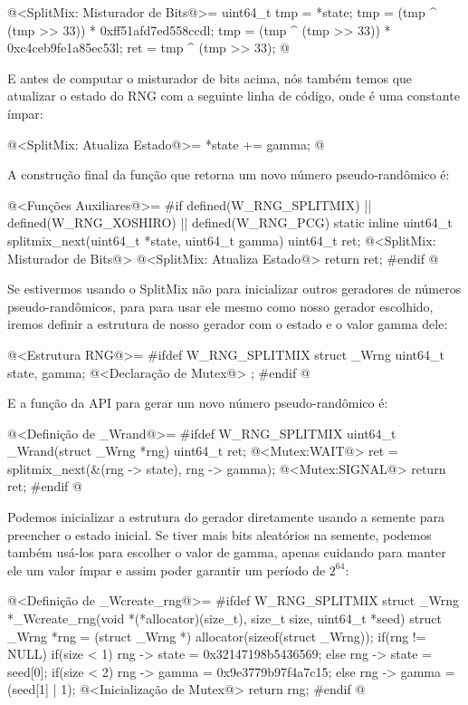 \iniciocodigo
@<SplitMix: Misturador de Bits@>=
{
  uint64_t tmp = *state;
  tmp = (tmp ^ (tmp >> 33)) * 0xff51afd7ed558ccdl;
  tmp = (tmp ^ (tmp >> 33)) * 0xc4ceb9fe1a85ec53l;
  ret = tmp ^ (tmp >> 33);
} 
@
\fimcodigo

E antes de computar o misturador de bits acima, nós também temos que
atualizar o estado do RNG com a seguinte linha de código,
onde  é uma constante ímpar:

\iniciocodigo
@<SplitMix: Atualiza Estado@>=
{
  *state +=  gamma;
} 
@
\fimcodigo

A construção final da função que retorna um novo número
pseudo-randômico é:

\iniciocodigo
@<Funções Auxiliares@>=
#if defined(W_RNG_SPLITMIX) || defined(W_RNG_XOSHIRO) || defined(W_RNG_PCG)
static inline uint64_t splitmix_next(uint64_t *state, uint64_t gamma){
  uint64_t ret;
  @<SplitMix: Misturador de Bits@>
  @<SplitMix: Atualiza Estado@>
  return ret;
}
#endif
@
\fimcodigo

Se estivermos usando o SplitMix não para inicializar outros geradores
de números pseudo-randômicos, para para usar ele mesmo como nosso
gerador escolhido, iremos definir a estrutura de nosso gerador com o
estado e o valor gamma dele:

\iniciocodigo
@<Estrutura RNG@>=
#ifdef W_RNG_SPLITMIX
struct _Wrng{
  uint64_t state, gamma;
  @<Declaração de Mutex@>
};
#endif
@
\fimcodigo

E a função da API para gerar um novo número pseudo-randômico é:

\iniciocodigo
@<Definição de \_Wrand@>=
#ifdef W_RNG_SPLITMIX
uint64_t _Wrand(struct _Wrng *rng){
  uint64_t ret;
  @<Mutex:WAIT@>
  ret = splitmix_next(&(rng -> state), rng -> gamma);
  @<Mutex:SIGNAL@>
  return ret;
}
#endif
@
\fimcodigo

Podemos inicializar a estrutura do gerador diretamente usando a
semente para preencher o estado inicial. Se tiver mais bits aleatórios
na semente, podemos também usá-los para escolher o valor de gamma,
apenas cuidando para manter ele um valor ímpar e assim poder garantir
um período de $2^{64}$:

\iniciocodigo
@<Definição de \_Wcreate\_rng@>=
#ifdef W_RNG_SPLITMIX
struct _Wrng *_Wcreate_rng(void *(*allocator)(size_t), size_t size,
                           uint64_t *seed){
  struct _Wrng *rng = (struct _Wrng *) allocator(sizeof(struct _Wrng));
  if(rng != NULL){
    if(size < 1)
      rng -> state = 0x32147198b5436569;
    else
      rng -> state = seed[0];
    if(size < 2)
      rng -> gamma = 0x9e3779b97f4a7c15;
    else
      rng -> gamma = (seed[1] | 1);
    @<Inicialização de Mutex@>
  }
  return rng;
}
#endif
@
\fimcodigo

